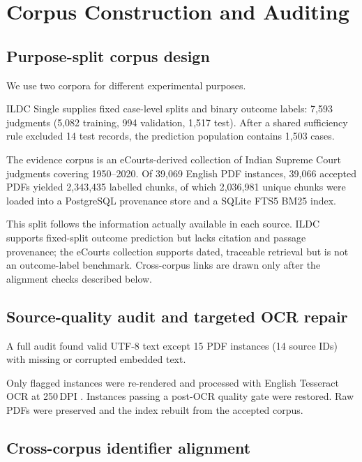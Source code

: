 \documentclass[conference]{IEEEtran}
\begin{document}
\section{Corpus Construction and Auditing}

\subsection{Purpose-split corpus design}

We use two corpora for different experimental purposes.

ILDC Single supplies fixed case-level splits and binary outcome labels: 7{,}593 judgments (5{,}082 training, 994 validation,
1{,}517 test). After a shared sufficiency rule excluded 14 test records,
the prediction population contains 1{,}503 cases.

The evidence corpus is an eCourts-derived collection of Indian Supreme Court
judgments covering 1950--2020. Of 39{,}069 English
PDF instances, 39{,}066 accepted PDFs yielded
2{,}343{,}435 labelled chunks, of which 2{,}036{,}981 unique chunks were loaded
into a PostgreSQL provenance store and a SQLite FTS5 BM25 index.

This split follows the information actually available in each source. ILDC
supports fixed-split outcome prediction but lacks citation and passage
provenance; the eCourts collection supports dated, traceable retrieval but is
not an outcome-label benchmark. Cross-corpus links are drawn only
after the alignment checks described below.

\subsection{Source-quality audit and targeted OCR repair}

A full audit found valid UTF-8 text except 15 PDF instances
(14 source IDs) with missing or corrupted embedded text.

Only flagged instances were re-rendered and processed with English Tesseract OCR
at 250\,DPI \cite{smith2007}. Instances passing a post-OCR quality gate were restored. Raw PDFs were preserved and the index rebuilt from the accepted corpus.

\subsection{Cross-corpus identifier alignment}
\label{sec:alignment}
\end{document}
